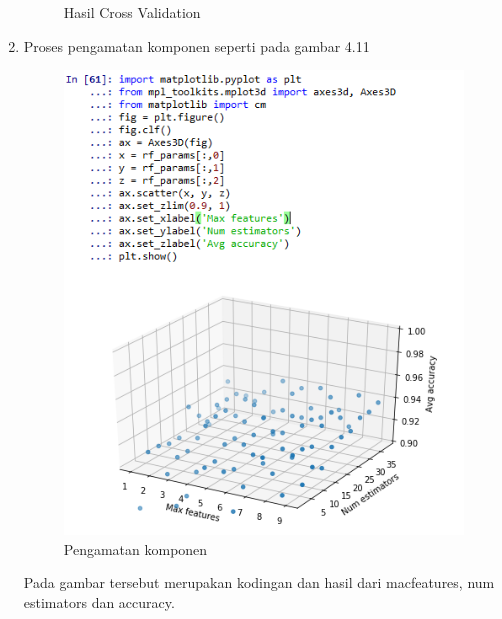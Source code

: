 \begin{enumerate}
\begin{figure}[ht]
\caption{Hasil Cross Validation}
\end{figure}
\item Proses pengamatan komponen seperti pada gambar 4.11
\begin{figure}[ht]
\centering
\includegraphics[scale=0.9]{figures/pandas/4_12.png}
\caption{Pengamatan komponen}
\end{figure}
\par Pada gambar tersebut merupakan kodingan dan hasil dari macfeatures, num estimators dan accuracy.
\end{enumerate}